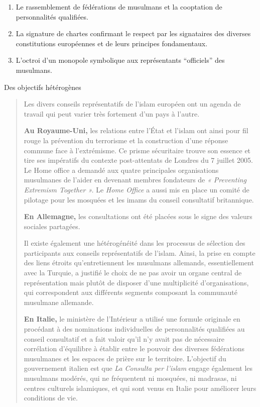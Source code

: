 \begin{enumerate}
\def\labelenumi{\arabic{enumi}.}
\item
  Le rassemblement de fédérations de musulmans et la cooptation de
  personnalités qualifiées.
\item
  La signature de chartes confirmant le respect par les signataires des
  diverses constitutions européennes et de leurs principes fondamentaux.
\item
  L'octroi d'un monopole symbolique aux représentants ``officiels'' des
  musulmans.
\end{enumerate}

Des objectifs hétérogènes

\begin{quote}
Les divers conseils représentatifs de l'islam européen ont un agenda de
travail qui peut varier très fortement d'un pays à l'autre.



\textbf{Au Royaume-Uni,} les relations entre l'État et l'islam ont ainsi
pour fil rouge la prévention du terrorisme et la construction d'une
réponse commune face à l'extrémisme. Ce prisme sécuritaire trouve son
essence et tire ses impératifs du contexte post-attentats de Londres du
7 juillet 2005. Le Home office a demandé aux quatre principales
organisations musulmanes de l'aider en devenant membres fondateurs de
\emph{« Preventing Extremism Together ».} Le \emph{Home Office} a aussi
mis en place un comité de pilotage pour les mosquées et les imams du
conseil consultatif britannique.

\textbf{En Allemagne,} les consultations ont été placées sous le signe
des valeurs sociales partagées.

Il existe également une hétérogénéité dans les processus de sélection
des participants aux conseils représentatifs de l'islam. Ainsi, la prise
en compte des liens étroits qu'entretiennent les musulmans allemands,
essentiellement avec la Turquie, a justifié le choix de ne pas avoir un
organe central de représentation mais plutôt de disposer d'une
multiplicité d'organisations, qui correspondent aux différents segments
composant la communauté musulmane allemande.

\textbf{En Italie,} le ministère de l'Intérieur a utilisé une formule
originale en procédant à des nominations individuelles de personnalités
qualifiées au conseil consultatif et a fait valoir qu'il n'y avait pas
de nécessaire corrélation d'équilibre à établir entre le pouvoir des
diverses fédérations musulmanes et les espaces de prière sur le
territoire. L'objectif du gouvernement italien est que \emph{La Consulta
per l'islam} engage également les musulmans modérés, qui ne fréquentent
ni mosquées, ni madrasas, ni centres culturels islamiques, et qui sont
venus en Italie pour améliorer leurs conditions de vie.


\end{quote}

